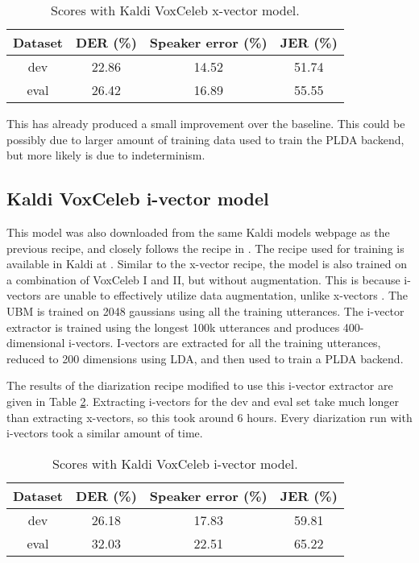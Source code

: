 			\begin{table}[h]
			\centering
			\begin{tabular}{|c|c|c|c|}
				\hline
				Dataset & DER (\%) & Speaker error (\%) & JER (\%) \\
				\hline
				dev & 22.86 & 14.52 & 51.74 \\
				\hline
				eval & 26.42 & 16.89 & 55.55 \\
				\hline
			\end{tabular}
			\caption{Scores with Kaldi VoxCeleb x-vector model.}
			\label{table-kaldi-xvec}
			\end{table}
		
			This has already produced a small improvement over the baseline. This could be possibly due to larger amount of training data used to train the PLDA backend, but more likely is due to indeterminism.
		
		\subsection{Kaldi VoxCeleb i-vector model}
			This model was also downloaded from the same Kaldi models webpage as the previous recipe, and closely follows the recipe in \cite{snyder2018x}. The recipe used for training is available in Kaldi at . Similar to the x-vector recipe, the model is also trained on a combination of VoxCeleb I and II, but without augmentation. This is because i-vectors are unable to effectively utilize data augmentation, unlike x-vectors \cite{snyder2018x}. The UBM is trained on 2048 gaussians using all the training utterances. The i-vector extractor is trained using the longest 100k utterances and produces 400-dimensional i-vectors. I-vectors are extracted for all the training utterances, reduced to 200 dimensions using LDA, and then used to train a PLDA backend.
			
			The results of the diarization recipe modified to use this i-vector extractor are given in Table \ref{table-kaldi-ivec}. Extracting i-vectors for the dev and eval set take much longer than extracting x-vectors, so this took around 6 hours. Every diarization run with i-vectors took a similar amount of time.
			
			\begin{table}[h]
				\centering
				\begin{tabular}{|c|c|c|c|}
					\hline
					Dataset & DER (\%) & Speaker error (\%) & JER (\%) \\
					\hline
					dev & 26.18 & 17.83 & 59.81 \\
					\hline
					eval & 32.03 & 22.51 & 65.22 \\
					\hline
				\end{tabular}
				\caption{Scores with Kaldi VoxCeleb i-vector model.}
				\label{table-kaldi-ivec}
			\end{table}
		
